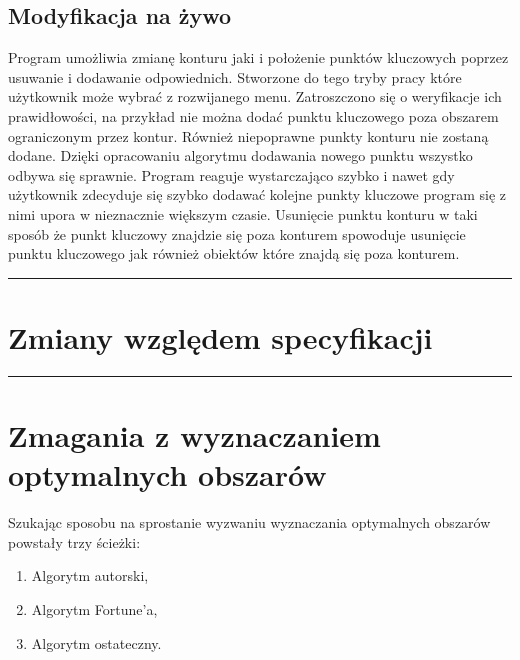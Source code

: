\documentclass[a4paper,11pt]{article}
\newcommand{\linia}{\rule{\linewidth}{0.4mm}}
\begin{document}
\subsection{Modyfikacja na żywo}
Program umożliwia zmianę konturu jaki i położenie punktów kluczowych poprzez usuwanie i dodawanie odpowiednich. Stworzone do tego tryby pracy które użytkownik może wybrać z rozwijanego menu. Zatroszczono się o weryfikacje ich prawidłowości, na przykład nie można dodać punktu kluczowego poza obszarem ograniczonym przez kontur. Również niepoprawne punkty konturu nie zostaną dodane. Dzięki opracowaniu algorytmu dodawania nowego punktu wszystko odbywa się sprawnie. Program reaguje wystarczająco szybko i nawet gdy użytkownik zdecyduje się szybko dodawać kolejne punkty kluczowe program się z nimi upora w nieznacznie większym czasie. Usunięcie punktu konturu w taki sposób że punkt kluczowy znajdzie się poza konturem spowoduje usunięcie punktu kluczowego jak również obiektów które znajdą się poza konturem.

\noindent\linia
\section{Zmiany względem specyfikacji}

\noindent\linia
\section{Zmagania z wyznaczaniem optymalnych obszarów}
Szukając sposobu na sprostanie wyzwaniu wyznaczania optymalnych obszarów powstały trzy ścieżki:
\begin{enumerate}
\item Algorytm autorski,
\item Algorytm Fortune'a,
\item Algorytm ostateczny.
\end{enumerate}
\end{document}
